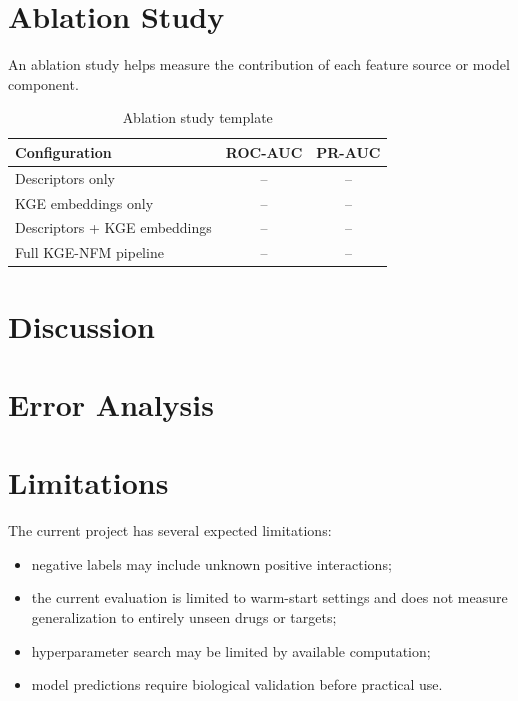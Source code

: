 \section{Ablation Study}

An ablation study helps measure the contribution of each feature source or
model component.

\begin{table}[H]
\centering
\caption{Ablation study template}
\label{tab:ablation_study}
\begin{tabular}{lcc}
\toprule
\textbf{Configuration} & \textbf{ROC-AUC} & \textbf{PR-AUC} \\
\midrule
Descriptors only & -- & -- \\
KGE embeddings only & -- & -- \\
Descriptors + KGE embeddings & -- & -- \\
Full KGE-NFM pipeline & -- & -- \\
\bottomrule
\end{tabular}
\end{table}

\section{Discussion}


\section{Error Analysis}


\section{Limitations}

The current project has several expected limitations:

\begin{itemize}
    \item negative labels may include unknown positive interactions;
    \item the current evaluation is limited to warm-start settings and does not
    measure generalization to entirely unseen drugs or targets;
    \item hyperparameter search may be limited by available computation;
    \item model predictions require biological validation before practical use.
\end{itemize}
